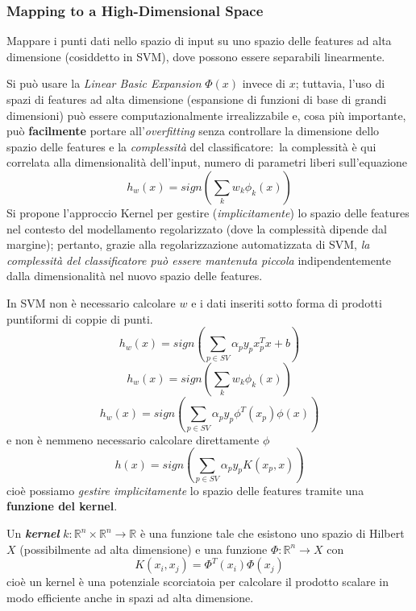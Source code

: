 \subsubsection{Mapping to a High-Dimensional Space}

Mappare i punti dati nello spazio di input su uno spazio delle features ad alta dimensione (cosiddetto in SVM), dove possono essere separabili linearmente.\

Si può usare la \textit{Linear Basic Expansion} $\Phi(x)$ invece di $x$; tuttavia, l'uso di spazi di features ad alta dimensione (espansione di funzioni di base di grandi dimensioni) può essere computazionalmente irrealizzabile e, cosa più importante, può \textbf{facilmente} portare all'\textit{overfitting} senza controllare la dimensione dello spazio delle features e la \textit{complessità} del classificatore:\ la complessità è qui correlata alla dimensionalità dell'input, numero di parametri liberi sull'equazione
\[h_w(x) = \mathit{sign}\left(\sum_kw_k\phi_k(x)\right)\]
Si propone l'approccio Kernel per gestire (\textit{implicitamente}) lo spazio delle features nel contesto del modellamento regolarizzato (dove la complessità dipende dal margine); pertanto, grazie alla regolarizzazione automatizzata di SVM, \textit{la complessità del classificatore può essere mantenuta piccola} indipendentemente dalla dimensionalità nel nuovo spazio delle features.

In SVM non è necessario calcolare $w$ e i dati inseriti sotto forma di prodotti puntiformi di coppie di punti.
\[h_w(x) = \mathit{sign}\left(\sum_{p \in \mathit{SV}}\alpha_py_px^T_px+b\right)\]
\[h_w(x) = \mathit{sign}\left(\sum_kw_k\phi_k(x)\right)\]
\[h_w(x) = \mathit{sign}\left(\sum_{p \in \mathit{SV}}\alpha_py_p\phi^T(x_p)\phi(x)\right)\]e non è nemmeno necessario calcolare direttamente $\phi$ \[h(x)= \mathit{sign}\left(\sum_{p \in \mathit{SV}}\alpha_py_pK(x_p,x)\right)\]cioè possiamo \textit{gestire implicitamente} lo spazio delle features tramite una \textbf{funzione del kernel}.

\begin{definition}
	Un \textbf{\textit{kernel}} $k: \mathbb{R}^n\times\mathbb{R}^n \rightarrow \mathbb{R}$ è una funzione tale che esistono uno spazio di Hilbert $X$ (possibilmente ad alta dimensione) e una funzione $\Phi: \mathbb{R}^n \rightarrow X$ con
	\[K (x_i, x_j) = \Phi^T(x_i)\Phi(x_j)\]
	cioè un kernel è una potenziale scorciatoia per calcolare il prodotto scalare in modo efficiente anche in spazi ad alta dimensione.
\end{definition}

